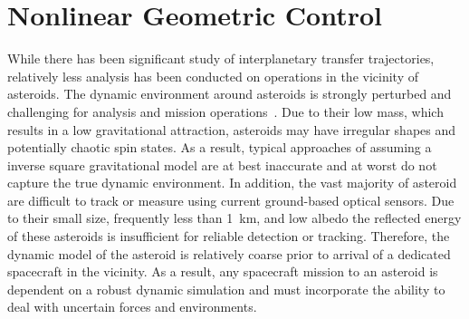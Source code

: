 
\chapter{Nonlinear Geometric Control}\label{sec:se3_control}

While there has been significant study of interplanetary transfer trajectories, relatively less analysis has been conducted on operations in the vicinity of asteroids.
The dynamic environment around asteroids is strongly perturbed and challenging for analysis and mission operations~\cite{scheeres1994,scheeres2000}.
Due to their low mass, which results in a low gravitational attraction, asteroids may have irregular shapes and potentially chaotic spin states.
As a result, typical approaches of assuming a inverse square gravitational model are at best inaccurate and at worst do not capture the true dynamic environment.
In addition, the vast majority of asteroid are difficult to track or measure using current ground-based optical sensors. 
Due to their small size, frequently less than \SI{1}{\kilo\meter}, and low albedo the reflected energy of these asteroids is insufficient for reliable detection or tracking.
Therefore, the dynamic model of the asteroid is relatively coarse prior to arrival of a dedicated spacecraft in the vicinity. 
As a result, any spacecraft mission to an asteroid is dependent on a robust dynamic simulation and must incorporate the ability to deal with uncertain forces and environments.

